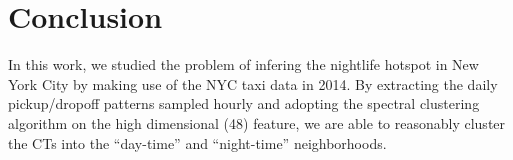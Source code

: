 \documentclass[journal]{IEEEtran}
\begin{document}
\section{Conclusion}
\label{sec:conclusion}
In this work, we studied the problem of infering the nightlife hotspot in New
York City by making use of the NYC taxi data in 2014. By extracting the daily
pickup/dropoff patterns sampled hourly and adopting the spectral clustering
algorithm on the high dimensional (48) feature, we are able to reasonably
cluster the CTs into the ``day-time'' and ``night-time'' neighborhoods. 
%
%



%
%
\end{document}
